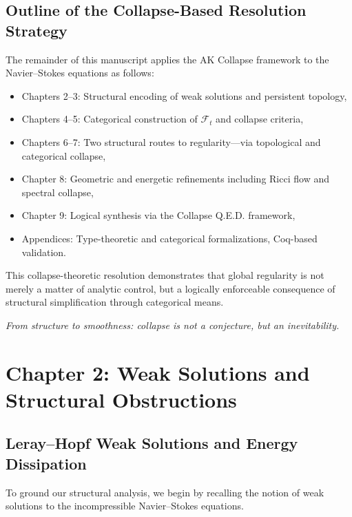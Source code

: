 \documentclass[11pt]{article}
\begin{document}
\subsection{Outline of the Collapse-Based Resolution Strategy}

The remainder of this manuscript applies the AK Collapse framework to the Navier--Stokes equations as follows:
\begin{itemize}
  \item Chapters 2–3: Structural encoding of weak solutions and persistent topology,
  \item Chapters 4–5: Categorical construction of \( \mathcal{F}_t \) and collapse criteria,
  \item Chapters 6–7: Two structural routes to regularity—via topological and categorical collapse,
  \item Chapter 8: Geometric and energetic refinements including Ricci flow and spectral collapse,
  \item Chapter 9: Logical synthesis via the Collapse Q.E.D. framework,
  \item Appendices: Type-theoretic and categorical formalizations, Coq-based validation.
\end{itemize}

This collapse-theoretic resolution demonstrates that global regularity is not merely a matter of analytic control, but a logically enforceable consequence of structural simplification through categorical means.

\begin{center}
\emph{From structure to smoothness: collapse is not a conjecture, but an inevitability.}
\end{center}



\section{Chapter 2: Weak Solutions and Structural Obstructions}
\label{sec:weak-solutions-obstructions}

\subsection{Leray--Hopf Weak Solutions and Energy Dissipation}

To ground our structural analysis, we begin by recalling the notion of weak solutions to the incompressible Navier--Stokes equations.
\end{document}
